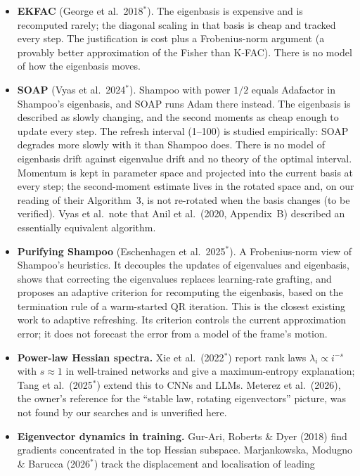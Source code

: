 \documentclass[11pt,a4paper]{article}
\theoremstyle{plain}
\theoremstyle{definition}
\theoremstyle{remark}
\begin{document}
\begin{itemize}
\item \textbf{EKFAC} (George et al.\ 2018$^*$). The eigenbasis is expensive and is recomputed rarely; the diagonal
  scaling in that basis is cheap and tracked every step. The justification is cost plus a Frobenius-norm argument
  (a provably better approximation of the Fisher than K-FAC). There is no model of how the eigenbasis moves.
\item \textbf{SOAP} (Vyas et al.\ 2024$^*$). Shampoo with power $1/2$ equals Adafactor in Shampoo's eigenbasis, and
  SOAP runs Adam there instead. The eigenbasis is described as slowly changing, and the second moments as cheap
  enough to update every step. The refresh interval (1--100) is studied empirically: SOAP degrades more slowly with
  it than Shampoo does. There is no model of eigenbasis drift against eigenvalue drift and no theory of the optimal
  interval. Momentum is kept in parameter space and projected into the current basis at every step; the second-moment
  estimate lives in the rotated space and, on our reading of their Algorithm~3, is not re-rotated when the basis
  changes (to be verified). Vyas et al.\ note that Anil et al.\ (2020, Appendix~B) described an essentially equivalent
  algorithm.
\item \textbf{Purifying Shampoo} (Eschenhagen et al.\ 2025$^*$). A Frobenius-norm view of Shampoo's heuristics. It
  decouples the updates of eigenvalues and eigenbasis, shows that correcting the eigenvalues replaces learning-rate
  grafting, and proposes an adaptive criterion for recomputing the eigenbasis, based on the termination rule of a
  warm-started QR iteration. This is the closest existing work to adaptive refreshing. Its criterion controls the
  current approximation error; it does not forecast the error from a model of the frame's motion.
\item \textbf{Power-law Hessian spectra.} Xie et al.\ (2022$^*$) report rank laws $\lambda_i\propto i^{-s}$ with
  $s\approx1$ in well-trained networks and give a maximum-entropy explanation; Tang et al.\ (2025$^*$) extend this to
  CNNs and LLMs. Meterez et al.\ (2026), the owner's reference for the ``stable law, rotating eigenvectors'' picture,
  was not found by our searches and is unverified here.
\item \textbf{Eigenvector dynamics in training.} Gur-Ari, Roberts \& Dyer (2018) find gradients concentrated in the
  top Hessian subspace. Marjankowska, Modugno \& Barucca (2026$^*$) track the displacement and localisation of leading

\end{itemize}
\end{document}
